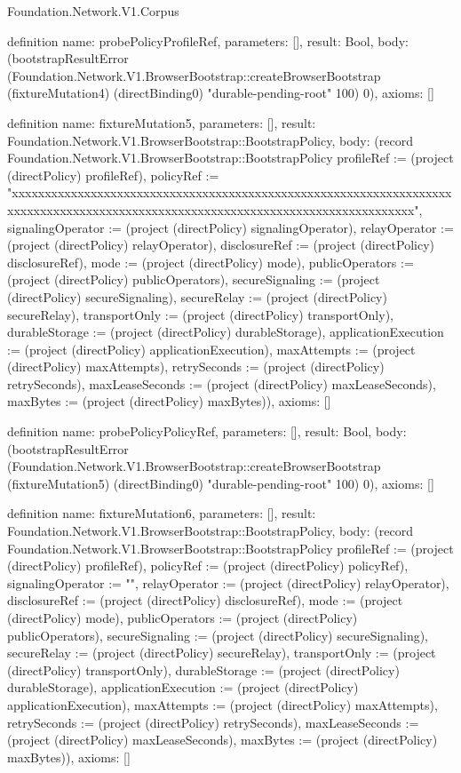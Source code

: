 \begin{lexlean}{Foundation.Network.V1.Corpus}
\begin{semanticmodule}
definition{
  name: probePolicyProfileRef,
  parameters: [],
  result: Bool,
  body: (bootstrapResultError (Foundation.Network.V1.BrowserBootstrap::createBrowserBootstrap (fixtureMutation4) (directBinding0) "durable-pending-root" 100) 0),
  axioms: []
}

definition{
  name: fixtureMutation5,
  parameters: [],
  result: Foundation.Network.V1.BrowserBootstrap::BootstrapPolicy,
  body: (record Foundation.Network.V1.BrowserBootstrap::BootstrapPolicy {profileRef := (project (directPolicy) profileRef), policyRef := "xxxxxxxxxxxxxxxxxxxxxxxxxxxxxxxxxxxxxxxxxxxxxxxxxxxxxxxxxxxxxxxxxxxxxxxxxxxxxxxxxxxxxxxxxxxxxxxxxxxxxxxxxxxxxxxxxxxxxxxxxxxxxxxxx", signalingOperator := (project (directPolicy) signalingOperator), relayOperator := (project (directPolicy) relayOperator), disclosureRef := (project (directPolicy) disclosureRef), mode := (project (directPolicy) mode), publicOperators := (project (directPolicy) publicOperators), secureSignaling := (project (directPolicy) secureSignaling), secureRelay := (project (directPolicy) secureRelay), transportOnly := (project (directPolicy) transportOnly), durableStorage := (project (directPolicy) durableStorage), applicationExecution := (project (directPolicy) applicationExecution), maxAttempts := (project (directPolicy) maxAttempts), retrySeconds := (project (directPolicy) retrySeconds), maxLeaseSeconds := (project (directPolicy) maxLeaseSeconds), maxBytes := (project (directPolicy) maxBytes)}),
  axioms: []
}

definition{
  name: probePolicyPolicyRef,
  parameters: [],
  result: Bool,
  body: (bootstrapResultError (Foundation.Network.V1.BrowserBootstrap::createBrowserBootstrap (fixtureMutation5) (directBinding0) "durable-pending-root" 100) 0),
  axioms: []
}

definition{
  name: fixtureMutation6,
  parameters: [],
  result: Foundation.Network.V1.BrowserBootstrap::BootstrapPolicy,
  body: (record Foundation.Network.V1.BrowserBootstrap::BootstrapPolicy {profileRef := (project (directPolicy) profileRef), policyRef := (project (directPolicy) policyRef), signalingOperator := "", relayOperator := (project (directPolicy) relayOperator), disclosureRef := (project (directPolicy) disclosureRef), mode := (project (directPolicy) mode), publicOperators := (project (directPolicy) publicOperators), secureSignaling := (project (directPolicy) secureSignaling), secureRelay := (project (directPolicy) secureRelay), transportOnly := (project (directPolicy) transportOnly), durableStorage := (project (directPolicy) durableStorage), applicationExecution := (project (directPolicy) applicationExecution), maxAttempts := (project (directPolicy) maxAttempts), retrySeconds := (project (directPolicy) retrySeconds), maxLeaseSeconds := (project (directPolicy) maxLeaseSeconds), maxBytes := (project (directPolicy) maxBytes)}),
  axioms: []
}


\end{semanticmodule}
\end{lexlean}
